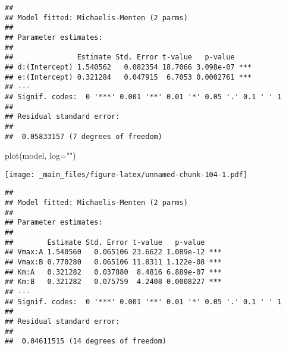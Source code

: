 \documentclass[
]{book}
\newenvironment{Shaded}{\begin{snugshade}}{\end{snugshade}}
\newcommand{\AttributeTok}[1]{\textcolor[rgb]{0.77,0.63,0.00}{#1}}
\newcommand{\CommentTok}[1]{\textcolor[rgb]{0.56,0.35,0.01}{\textit{#1}}}
\newcommand{\DecValTok}[1]{\textcolor[rgb]{0.00,0.00,0.81}{#1}}
\newcommand{\FunctionTok}[1]{\textcolor[rgb]{0.00,0.00,0.00}{#1}}
\newcommand{\NormalTok}[1]{#1}
\newcommand{\OtherTok}[1]{\textcolor[rgb]{0.56,0.35,0.01}{#1}}
\newcommand{\SpecialCharTok}[1]{\textcolor[rgb]{0.00,0.00,0.00}{#1}}
\newcommand{\StringTok}[1]{\textcolor[rgb]{0.31,0.60,0.02}{#1}}
\begin{document}
\begin{verbatim}
## 
## Model fitted: Michaelis-Menten (2 parms)
## 
## Parameter estimates:
## 
##               Estimate Std. Error t-value   p-value    
## d:(Intercept) 1.540562   0.082354 18.7066 3.098e-07 ***
## e:(Intercept) 0.321284   0.047915  6.7053 0.0002761 ***
## ---
## Signif. codes:  0 '***' 0.001 '**' 0.01 '*' 0.05 '.' 0.1 ' ' 1
## 
## Residual standard error:
## 
##  0.05833157 (7 degrees of freedom)
\end{verbatim}

\begin{Shaded}
\begin{Highlighting}[]
\FunctionTok{plot}\NormalTok{(model, }\AttributeTok{log=}\StringTok{""}\NormalTok{)}
\end{Highlighting}
\end{Shaded}

\texttt{[image: \_main\_files/figure-latex/unnamed-chunk-104-1.pdf]}

\begin{Shaded}
\end{Shaded}

\begin{verbatim}
## 
## Model fitted: Michaelis-Menten (2 parms)
## 
## Parameter estimates:
## 
##        Estimate Std. Error t-value   p-value    
## Vmax:A 1.540560   0.065106 23.6622 1.089e-12 ***
## Vmax:B 0.770280   0.065106 11.8311 1.122e-08 ***
## Km:A   0.321282   0.037880  8.4816 6.889e-07 ***
## Km:B   0.321282   0.075759  4.2408 0.0008227 ***
## ---
## Signif. codes:  0 '***' 0.001 '**' 0.01 '*' 0.05 '.' 0.1 ' ' 1
## 
## Residual standard error:
## 
##  0.04611515 (14 degrees of freedom)
\end{verbatim}
\end{document}
